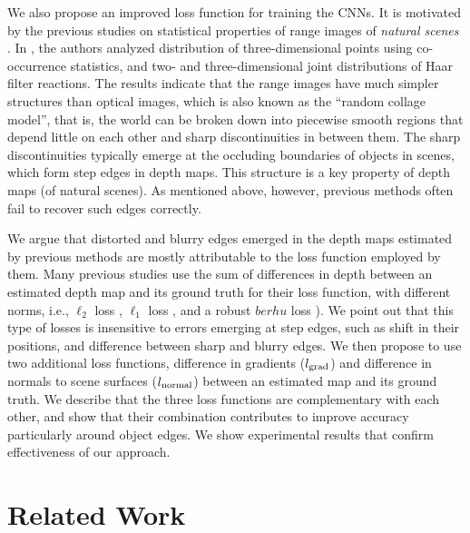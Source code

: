 \documentclass[10pt,twocolumn,letterpaper]{article}
\begin{document}
We also propose an improved loss function for training the CNNs.
It is motivated by the previous studies on statistical properties of range images of {\em natural scenes} \cite{huang2000statistics,LeeIJCV03,kalkan}. In \cite{huang2000statistics}, the authors analyzed distribution of three-dimensional points using co-occurrence statistics, and two- and three-dimensional joint distributions of Haar filter reactions. The results indicate that the range images have much simpler structures than optical images, which is also known as the ``random collage model'', that is, the world can be broken down into piecewise smooth regions that depend little on each other and sharp discontinuities in between them.
The sharp discontinuities typically emerge at the occluding boundaries of objects in scenes, which form step edges in depth maps. This structure is a key property of depth maps (of natural scenes).
As mentioned above, however, previous methods often fail to recover such edges correctly.


We argue that distorted and blurry edges emerged in the depth maps estimated by previous methods are mostly attributable to the loss function employed by them. Many previous studies use the sum of differences in depth between an estimated depth map and
its ground truth for their loss function, with different norms, i.e., $\ell_2$ loss
\cite{Eigen2014depth,Li2015DepthAS,liu2016learning}, $\ell_1$ loss \cite{ma2017sparse,Park2017JointEO}, and a
robust $berhu$ loss \cite{laina2016deeper}).
We point out that this type of losses is insensitive to errors emerging at step edges, such as shift in their positions, and difference between sharp and blurry edges. 
We then propose to use two additional loss
functions, difference in gradients 
($l_{\rm grad}$)
and difference in normals to scene surfaces
($l_{\rm normal}$)
between an estimated map and its ground truth. 
We describe that the three loss functions are complementary with each other, and show that their combination contributes to improve
accuracy particularly around object edges. We show experimental results that confirm effectiveness of our approach. 


\section{Related Work}
\end{document}
